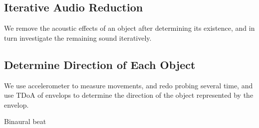 \subsection{Iterative Audio Reduction}

We remove the acoustic effects of an object after determining its existence, and 
in turn investigate the remaining sound iteratively. 


\subsection{Determine Direction of Each Object}

We use accelerometer to measure movements, and redo probing several time, and 
use TDoA of envelops to determine the direction of the object represented by the envelop.


Binaural beat
